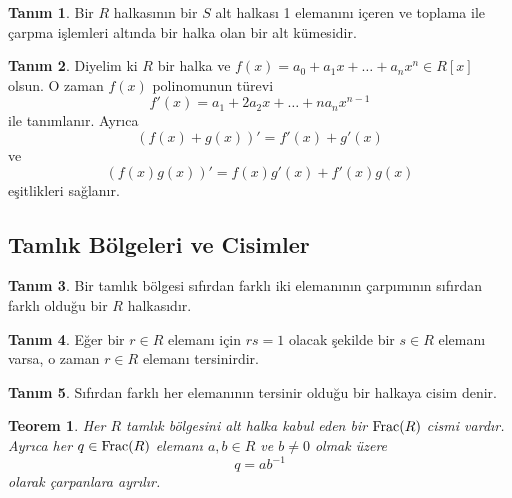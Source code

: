 \documentclass{article}
\newtheorem{thm}{Teorem}[section]
\theoremstyle{definition}
\newtheorem{defn}{Tanım}[section]
\theoremstyle{remark}
\begin{document}
    		\begin{defn}
    		    Bir $R$ halkasının bir $S$ alt halkası 1 elemanını içeren ve toplama ile çarpma işlemleri altında bir halka olan bir alt kümesidir.
    		\end{defn}
    		
    		\begin{defn}
    		    Diyelim ki $R$ bir halka ve $f(x) = a_0 + a_1x + \dots + a_nx^n \in R[x]$ olsun. O zaman $f(x)$ polinomunun türevi
    		    \begin{equation*}
    		        f'(x) = a_1 + 2a_2x+ \dots + na_nx^{n - 1}
    		    \end{equation*}
    		    ile tanımlanır. Ayrıca
    		    \begin{equation*}
    		        (f(x) + g(x))' = f'(x) + g'(x)
    		    \end{equation*}
    		    ve
    		    \begin{equation*}
    		        (f(x)g(x))' = f(x)g'(x) + f'(x)g(x)
    		    \end{equation*}
    		    eşitlikleri sağlanır.
    		\end{defn}
		
		\subsection{Tamlık Bölgeleri ve Cisimler}
		
    		\begin{defn}
    		    Bir tamlık bölgesi sıfırdan farklı iki elemanının çarpımının sıfırdan farklı olduğu bir $R$ halkasıdır.
    		\end{defn}
    		
    		\begin{defn}
    		    Eğer bir $r \in R$ elemanı için $rs = 1$ olacak şekilde bir $s \in R$ elemanı varsa, o zaman $r \in R$ elemanı tersinirdir.
    		\end{defn}
        	    
            \begin{defn}
                Sıfırdan farklı her elemanının tersinir olduğu bir halkaya cisim denir.
        	\end{defn}
        	
        	\begin{thm}
        	    Her $R$ tamlık bölgesini alt halka kabul eden bir $\textup{Frac}(R)$ cismi vardır. Ayrıca her $q \in \textup{Frac}(R)$ elemanı $a, b \in R$ ve $b \neq 0$ olmak üzere
        	    \begin{equation*}
				    q = ab^{-1}
			    \end{equation*}
			    olarak çarpanlara ayrılır.
		    \end{thm}
		    
\end{document}
